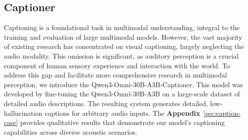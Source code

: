 




\subsection{Captioner}
Captioning is a foundational task in multimodal understanding, integral to the training and evaluation of large multimodal models. However, the vast majority of existing research has concentrated on visual captioning, largely neglecting the audio modality. This omission is significant, as auditory perception is a crucial component of human sensory experience and interaction with the world. To address this gap and facilitate more comprehensive research in multimodal perception, we introduce the Qwen3-Omni-30B-A3B-Captioner. This model was developed by fine-tuning the Qwen3-Omni-30B-A3B on a large-scale dataset of detailed audio descriptions. The resulting system generates detailed, low-hallucination captions for arbitrary audio inputs. The \textbf{Appendix}~\ref{sec:caption-case} provides qualitative results that demonstrate our model's captioning capabilities across diverse acoustic scenarios.




